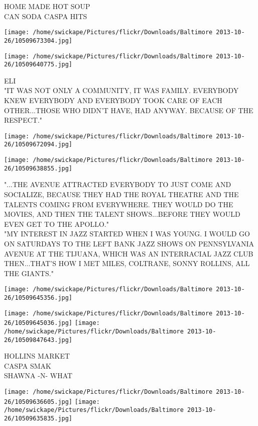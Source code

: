 \documentclass[10pt,letterpaper]{article}
\begin{document}
HOME MADE HOT SOUP\\
CAN SODA CASPA HITS\\
\pagebreak

\texttt{[image: /home/swickape/Pictures/flickr/Downloads/Baltimore 2013-10-26/10509673304.jpg]}

\vspace{0.25in}
\texttt{[image: /home/swickape/Pictures/flickr/Downloads/Baltimore 2013-10-26/10509640775.jpg]}

ELI\\
"IT WAS NOT ONLY A COMMUNITY, IT WAS FAMILY.  EVERYBODY KNEW EVERYBODY AND EVERYBODY TOOK CARE OF EACH OTHER...THOSE WHO DIDN'T HAVE, HAD ANYWAY.  BECAUSE OF THE RESPECT."\\
\pagebreak

\texttt{[image: /home/swickape/Pictures/flickr/Downloads/Baltimore 2013-10-26/10509672094.jpg]}

\vspace{0.25in}
\texttt{[image: /home/swickape/Pictures/flickr/Downloads/Baltimore 2013-10-26/10509638855.jpg]}

"...THE AVENUE ATTRACTED EVERYBODY TO JUST COME AND SOCIALIZE, BECAUSE THEY HAD THE ROYAL THEATRE AND THE TALENTS COMING FROM EVERYWHERE.  THEY WOULD DO THE MOVIES, AND THEN THE TALENT SHOWS...BEFORE THEY WOULD EVEN GET TO THE APOLLO."\\
"MY INTEREST IN JAZZ STARTED WHEN I WAS YOUNG.  I WOULD GO ON SATURDAYS TO THE LEFT BANK JAZZ SHOWS ON PENNSYLVANIA AVENUE AT THE TIJUANA, WHICH WAS AN INTERRACIAL JAZZ CLUB THEN...THAT'S HOW I MET MILES, COLTRANE, SONNY ROLLINS, ALL THE GIANTS."\\
\pagebreak

\texttt{[image: /home/swickape/Pictures/flickr/Downloads/Baltimore 2013-10-26/10509645356.jpg]}

\vspace{0.25in}
\texttt{[image: /home/swickape/Pictures/flickr/Downloads/Baltimore 2013-10-26/10509645036.jpg]}
\texttt{[image: /home/swickape/Pictures/flickr/Downloads/Baltimore 2013-10-26/10509847643.jpg]}

HOLLINS MARKET\\
CASPA SMAK\\
SHAWNA {-}N{-} WHAT\\
\pagebreak

\texttt{[image: /home/swickape/Pictures/flickr/Downloads/Baltimore 2013-10-26/10509636605.jpg]}
\texttt{[image: /home/swickape/Pictures/flickr/Downloads/Baltimore 2013-10-26/10509635835.jpg]}
\end{document}
